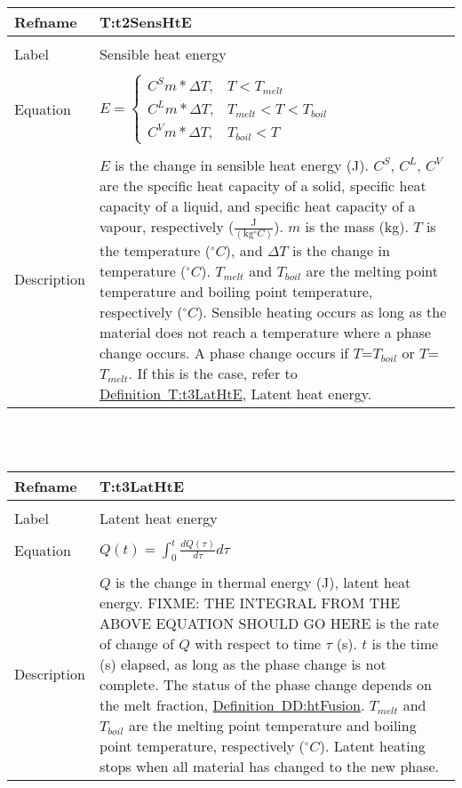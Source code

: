 \documentclass[12pt]{article}
\begin{document}
\noindent \begin{minipage}{\textwidth}
\begin{tabular}{p{} p{}}
\toprule \textbf{Refname} & \textbf{T:t2SensHtE}
\label{T:t2SensHtE}
\\ \midrule \\
Label & Sensible heat energy
\\ \midrule \\
Equation & $E=\begin{cases}
C^{S}m*\Delta{}T, & T<T_{melt}\\
C^{L}m*\Delta{}T, & T_{melt}<T<T_{boil}\\
C^{V}m*\Delta{}T, & T_{boil}<T
\end{cases}$
\\ \midrule \\
Description & $E$ is the change in sensible heat energy (J). $C^{S}$, $C^{L}$, $C^{V}$ are the specific heat capacity of a solid, specific heat capacity of a liquid, and specific heat capacity of a vapour, respectively ($\frac{\text{J}}{(\text{kg}{}^{\circ}C)}$). $m$ is the mass (kg). $T$ is the temperature (${}^{\circ}C$), and $\Delta{}T$ is the change in temperature (${}^{\circ}C$). $T_{melt}$ and $T_{boil}$ are the melting point temperature and boiling point temperature, respectively (${}^{\circ}C$). Sensible heating occurs as long as the material does not reach a temperature where a phase change occurs. A phase change occurs if $T$=$T_{boil}$ or $T$=$T_{melt}$. If this is the case, refer to \hyperref[T:t3LatHtE]{Definition~T:t3LatHtE}, Latent heat energy.
\\ \bottomrule \end{tabular}
\end{minipage}\\
~\newline
\noindent \begin{minipage}{\textwidth}
\begin{tabular}{p{} p{}}
\toprule \textbf{Refname} & \textbf{T:t3LatHtE}
\label{T:t3LatHtE}
\\ \midrule \\
Label & Latent heat energy
\\ \midrule \\
Equation & $Q(t)=\int_{0}^{t}{\frac{dQ(\tau{})}{d\tau{}}d\tau{}}$
\\ \midrule \\
Description & $Q$ is the change in thermal energy (J), latent heat energy. FIXME: THE INTEGRAL FROM THE ABOVE EQUATION SHOULD GO HERE is the rate of change of $Q$ with respect to time $\tau{}$ (s). $t$ is the time (s) elapsed, as long as the phase change is not complete. The status of the phase change depends on the melt fraction, \hyperref[DD:htFusion]{Definition~DD:htFusion}. $T_{melt}$ and $T_{boil}$ are the melting point temperature and boiling point temperature, respectively (${}^{\circ}C$). Latent heating stops when all material has changed to the new phase.
\\ \bottomrule \end{tabular}
\end{minipage}\\
\end{document}
